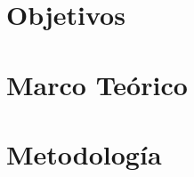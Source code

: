 \documentclass{article}
\begin{document}

\tableofcontents
\newpage

\section{Objetivos}



\section{Marco Teórico}



\section{Metodología}



\FloatBarrier
\end{document}
